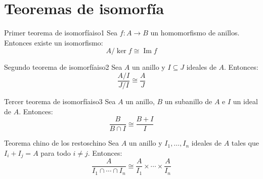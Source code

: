 \clearpage
\section{Teoremas de isomorfía}

\begin{theorem}{Primer teorema de isomorfía}{iso1}
    Sea \(f: A \to B\) un homomorfismo de anillos. Entonces existe un isomorfismo:
    \[
    A/\ker f \cong \operatorname{Im} f
    \]
\end{theorem}

\begin{theorem}{Segundo teorema de isomorfía}{iso2}
    Sea \(A\) un anillo y \(I \subseteq J\) ideales de \(A\). Entonces:
    \[
    \frac{A/I}{J/I} \cong \frac{A}{J}
    \]
\end{theorem}

\begin{theorem}{Tercer teorema de isomorfía}{iso3}
    Sea \(A\) un anillo, \(B\) un subanillo de \(A\) e \(I\) un ideal de \(A\). Entonces:
    \[
    \frac{B}{B \cap I} \cong \frac{B + I}{I}
    \]
\end{theorem}

\begin{theorem}{Teorema chino de los restos}{chino}
    Sea \(A\) un anillo y \(I_1, \ldots, I_n\) ideales de \(A\) tales que \(I_i + I_j = A\) para todo \(i \neq j\). Entonces:
    \[
    \frac{A}{I_1 \cap \cdots \cap I_n} \cong \frac{A}{I_1} \times \cdots \times \frac{A}{I_n}
    \]
\end{theorem}